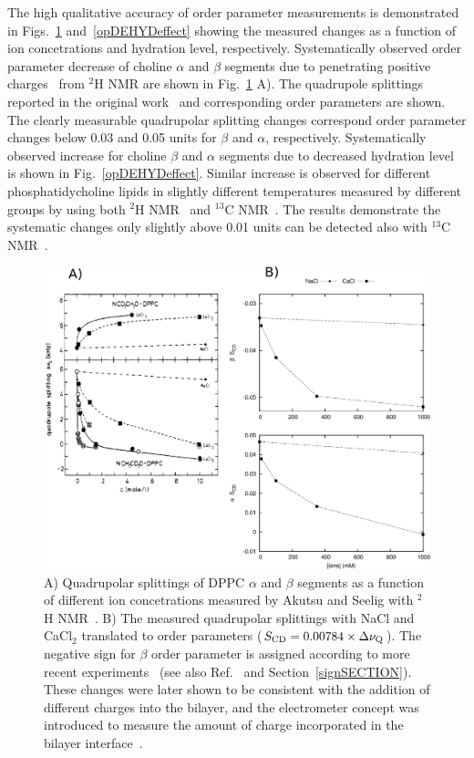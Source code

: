 \documentclass[aps,prl,superscriptaddress,twocolumn]{revtex4}
\begin{document}
The high qualitative accuracy of order parameter measurements is demonstrated in Figs.~\ref{opIONeffect} and~\ref{opDEHYDeffect}
showing the measured changes as a function of ion concetrations and hydration level, respectively.
Systematically observed order parameter decrease of choline $\alpha$ and $\beta$ segments due to penetrating 
positive charges~\cite{akutsu81,altenbach84,seelig87,scherer89} from $^2$H NMR are shown in Fig.~\ref{opIONeffect} A).
The quadrupole splittings reported in the original work~\cite{akutsu81} and corresponding order parameters 
are shown. The clearly measurable quadrupolar splitting changes correspond order parameter changes below 0.03 and 
0.05 units for $\beta$ and $\alpha$, respectively. Systematically observed increase for choline $\beta$ and $\alpha$
segments due to decreased hydration level is shown in Fig.~\ref{opDEHYDeffect}. 
Similar increase is observed for different phosphatidycholine lipids in slightly different temperatures measured by
different groups by using both $^2$H NMR~\cite{bechinger91,ulrich94} and $^{13}$C NMR~\cite{dvinskikh05b}.
The results demonstrate the systematic changes only slightly above 0.01 units can be detected also with $^{13}$C NMR~\cite{dvinskikh05b}.

\begin{figure}[]
  \includegraphics[width=17.2cm]{../Fig/QPandOPwithIONS.eps}
  \caption{\label{opIONeffect}
    A) Quadrupolar splittings of DPPC $\alpha$ and $\beta$ segments as a function of different 
    ion concetrations measured by Akutsu and Seelig with $^2$H NMR~\cite{akutsu81}. 
    B) The measured quadrupolar splittings with NaCl and CaCl$_2$ translated to order parameters ($S_{{\rm CD}}=0.00784 \times \Delta \nu_{{\rm Q}}$). 
    The negative sign for $\beta$ order parameter is assigned according to more recent experiments~\cite{hong95a,hong95b,gross97} 
    (see also Ref.~\cite{botan15} and Section~\ref{signSECTION}). These changes were later shown to be consistent with the 
    addition of different charges into the bilayer, and the electrometer concept was introduced to measure the amount of charge 
    incorporated in the bilayer interface~\cite{akutsu81,altenbach84,seelig87,scherer89}.
  } 
\end{figure}
\end{document}
